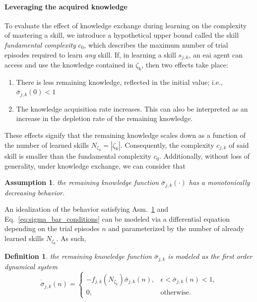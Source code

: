 \documentclass[12pt]{article}
\renewcommand{\emph}[1]{\textit{#1}}
\newtheorem{assumption}{Assumption}
\newtheorem{definition}{Definition}
\begin{document}
\paragraph*{Leveraging the acquired knowledge}
To evaluate the effect of knowledge exchange during learning on the complexity of mastering a skill, we introduce a hypothetical upper bound called the skill \textit{fundamental complexity} $c_0$, which describes the maximum number of trial episodes required to learn \emph{any} skill. If, in learning a skill $ s_{j,k} $, an \ac{eai} agent can access and use the knowledge contained in $\mathcal{\zeta}_k$, then two effects take place:
\begin{enumerate}
	\item There is less remaining knowledge, reflected in the initial value; i.e., $\bar{\sigma}_{j,k}(0) < 1$
	\item The knowledge acquisition rate increases. This can also be interpreted as an increase in the depletion rate of the remaining knowledge.
\end{enumerate}
These effects signify that the remaining knowledge scales down as a function of the number of learned skills $N_{\zeta_k}=|\mathcal{\zeta}_k|$. Consequently, the complexity $c_{j,k}$ of said skill is smaller than the fundamental complexity $c_0$. Additionally, without loss of generality, under knowledge exchange, we can consider that
\begin{tcolorbox}
	\begin{assumption}\label{assumption:exponential_decrease} the remaining knowledge function $\bar{\sigma}_{j,k}(\cdot)$ has a monotonically decreasing behavior.
	\end{assumption}
\end{tcolorbox} 
\noindent An idealization of the behavior satisfying Asm.~\ref{assumption:exponential_decrease} and Eq.~\eqref{eq:sigma_bar_conditions} can be modeled via a differential equation depending on the trial episodes $n$ and parameterized by the number of already learned skills $N_{\zeta_k}$. As such,
\begin{definition}\label{assumption:ode_model} the remaining knowledge function $\bar{\sigma}_{j,k}$ is modeled as the first order dynamical system
	\begin{equation}\label{eq:simple_knowledge_dynamics}
		\dot{\bar{\sigma}}_{j,k}\left(n\right)=\begin{cases}
			-f_{j,k} \left(N_{\zeta_k} \right) \bar{\sigma}_{j,k}\left(n\right), & \epsilon < \bar{\sigma}_{j,k}\left(n\right) < 1, \\
			0, & \text{otherwise}.
		\end{cases}
	\end{equation}	
\end{definition}
\end{document}
